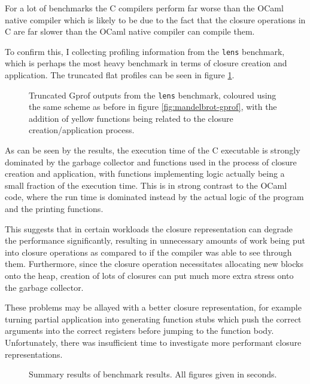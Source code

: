 \documentclass[12pt,a4paper,twoside,openright]{report}
\begin{document}
For a lot of benchmarks the C compilers perform far worse than the OCaml native 
compiler which is likely to be due to the fact that the closure operations in C 
are far slower than the OCaml native compiler can compile them.

To confirm this, I collecting profiling information from the \texttt{lens} 
benchmark, which is perhaps the most heavy benchmark in terms of closure 
creation and application. The truncated flat profiles can be seen in figure 
\ref{fig:closure-creation}.

\begin{figure}
    \centering
    
    \caption{Truncated Gprof outputs from the \texttt{lens} benchmark, coloured 
    using the same scheme as before in figure \ref{fig:mandelbrot-gprof}, with 
    the addition of yellow functions being related to the closure 
    creation/application process.}
    \label{fig:closure-creation}
\end{figure}

As can be seen by the results, the execution time of the C executable is 
strongly dominated by the garbage collector and functions used in the process 
of closure creation and application, with functions implementing logic actually 
being a small fraction of the execution time. This is in strong contrast to the 
OCaml code, where the run time is dominated instead by the actual logic of the 
program and the printing functions.

This suggests that in certain workloads the closure representation can degrade 
the performance significantly, resulting in unnecessary amounts of work being 
put into closure operations as compared to if the compiler was able to see 
through them. Furthermore, since the closure operation necessitates allocating 
new blocks onto the heap, creation of lots of closures can put much more extra 
stress onto the garbage collector.

These problems may be allayed with a better closure representation, for example 
turning partial application into generating function stubs which push the 
correct arguments into the correct registers before jumping to the function 
body. Unfortunately, there was insufficient time to investigate more performant 
closure representations.

\begin{figure}
    \centering
    \resizebox{\textwidth}{!}{
        
    }
    \caption{Summary results of benchmark results. All figures given in 
    seconds.}
\end{figure}
\end{document}
